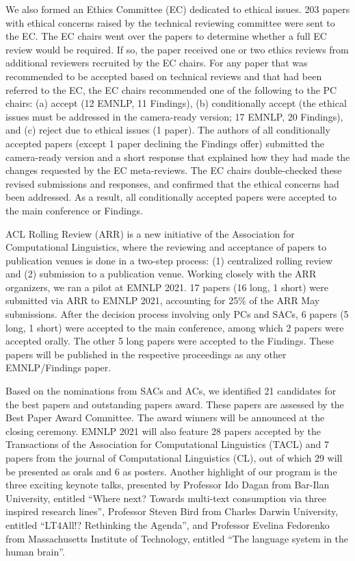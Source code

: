 We also formed an Ethics Committee (EC) dedicated to ethical issues. 203 papers with ethical concerns raised by the technical reviewing committee were sent to the EC. The EC chairs went over the papers to determine whether a full EC review would be required. If so, the paper received one or two ethics reviews from additional reviewers recruited by the EC chairs. For any paper that was recommended to be accepted based on technical reviews and that had been referred to the EC, the EC chairs recommended one of the following to the PC chairs: (a) accept (12 EMNLP, 11 Findings), (b) conditionally accept (the ethical issues must be addressed in the camera-ready version; 17 EMNLP, 20 Findings), and (c) reject due to ethical issues (1 paper). The authors of all conditionally accepted papers (except 1 paper declining the Findings offer) submitted the camera-ready version and a short response that explained how they had made the changes requested by the EC meta-reviews. The EC chairs double-checked these revised submissions and responses, and confirmed that the ethical concerns had been addressed. As a result, all conditionally accepted papers were accepted to the main conference or Findings.

ACL Rolling Review (ARR) is a new initiative of the Association for Computational Linguistics, where the reviewing and acceptance of papers to publication venues is done in a two-step process: (1) centralized rolling review and (2) submission to a publication venue. Working closely with the ARR organizers, we ran a pilot at EMNLP 2021. 17 papers (16 long, 1 short) were submitted via ARR to EMNLP 2021, accounting for 25\% of the ARR May submissions. After the decision process involving only PCs and SACs, 6 papers (5 long, 1 short) were accepted to the main conference, among which 2 papers were accepted orally. The other 5 long papers were accepted to the Findings. These papers will be published in the respective proceedings as any other EMNLP/Findings paper.

Based on the nominations from SACs and ACs, we identified 21 candidates for the best papers and outstanding papers award. These papers are assessed by the Best Paper Award Committee. The award winners will be announced at the closing ceremony.
EMNLP 2021 will also feature 28 papers accepted by the Transactions of the Association for Computational Linguistics (TACL) and 7 papers from the journal of Computational Linguistics (CL), out of which 29 will be presented as orals and 6 as posters.
Another highlight of our program is the three exciting keynote talks, presented by Professor Ido Dagan from Bar-Ilan University, entitled ``Where next? Towards multi-text consumption via three inspired research lines'', Professor Steven Bird from Charles Darwin University, entitled ``LT4All!? Rethinking the Agenda'', and Professor Evelina Fedorenko from Massachusetts Institute of Technology, entitled ``The language system in the human brain''.


